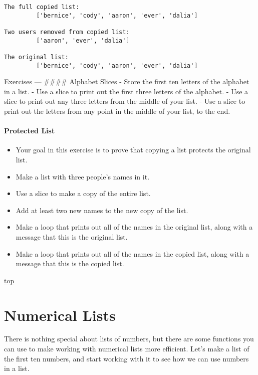 \documentclass[11pt]{article}
\providecommand{\tightlist}{%
      \setlength{\itemsep}{0pt}\setlength{\parskip}{0pt}}
\begin{document}
    \begin{Verbatim}[commandchars=\\\{\}]
The full copied list:
         ['bernice', 'cody', 'aaron', 'ever', 'dalia']

Two users removed from copied list:
         ['aaron', 'ever', 'dalia']

The original list:
         ['bernice', 'cody', 'aaron', 'ever', 'dalia']
    \end{Verbatim}

    Exercises --- \#\#\#\# Alphabet Slices - Store the first ten letters of
the alphabet in a list. - Use a slice to print out the first three
letters of the alphabet. - Use a slice to print out any three letters
from the middle of your list. - Use a slice to print out the letters
from any point in the middle of your list, to the end.

\hypertarget{protected-list}{%
\paragraph{Protected List}\label{protected-list}}

\begin{itemize}
\tightlist
\item
  Your goal in this exercise is to prove that copying a list protects
  the original list.
\item
  Make a list with three people's names in it.
\item
  Use a slice to make a copy of the entire list.
\item
  Add at least two new names to the new copy of the list.
\item
  Make a loop that prints out all of the names in the original list,
  along with a message that this is the original list.
\item
  Make a loop that prints out all of the names in the copied list, along
  with a message that this is the copied list.
\end{itemize}

    \protect\hyperlink{}{top}

    \hypertarget{numerical-lists}{%
\section{Numerical Lists}\label{numerical-lists}}

There is nothing special about lists of numbers, but there are some
functions you can use to make working with numerical lists more
efficient. Let's make a list of the first ten numbers, and start working
with it to see how we can use numbers in a list.
\end{document}
